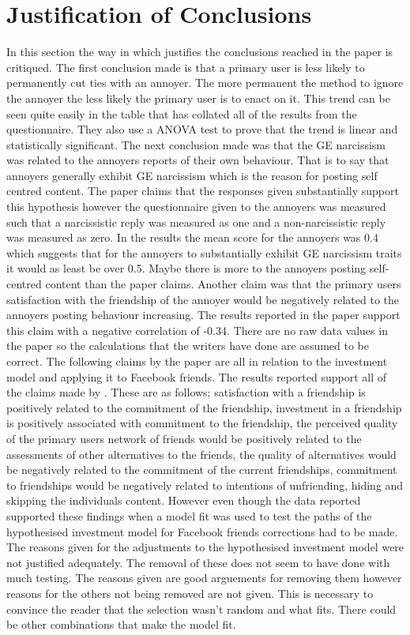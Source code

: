 \documentclass[12pt]{article}
\begin{document}
\section{Justification of Conclusions}
In this section the way in which \cite{Carpenter} justifies the conclusions reached in the paper is critiqued. The first conclusion made is that a primary user is less likely to permanently cut ties with an annoyer. The more permanent the method to ignore the annoyer the less likely the primary user is to enact on it. This trend can be seen quite easily in the table that has collated all of the results from the questionnaire. They also use a ANOVA test to prove that the trend is linear and statistically significant. 
The next conclusion made was that the GE narcissism was related to the annoyers reports of their own behaviour. That is to say that annoyers generally exhibit GE narcissism which is the reason for posting self centred content. The paper claims that the responses given substantially support this hypothesis however the questionnaire given to the annoyers was measured such that a narcissistic reply was measured as one and a non-narcissistic reply was measured as zero. In the results the mean score for the annoyers was 0.4 which suggests that for the annoyers to substantially exhibit GE narcissism traits it would as least be over 0.5. Maybe there is more to the annoyers posting self-centred content than the paper claims. 
Another claim was that the primary users satisfaction with the friendship of the annoyer would be negatively related to the annoyers posting behaviour increasing. The results reported in the paper support this claim with a negative correlation of -0.34. There are no raw data values in the paper so the calculations that the writers have done are assumed to be correct.
The following claims by the paper are all in relation to the investment model and applying it to Facebook friends. The results reported support all of the claims made by \cite{Carpenter}. These are as follows; satisfaction with a friendship is positively related to the commitment of the friendship, investment in a friendship is positively associated with commitment to the friendship, the perceived quality of the primary users network of friends would be positively related to the assessments of other alternatives to the friends, the quality of alternatives would be negatively related to the commitment of the current friendships, commitment to friendships would be negatively related to intentions of unfriending, hiding and skipping the individuals content. 
However even though the data reported supported these findings when a model fit was used to test the paths of the hypothesised investment model for Facebook friends corrections had to be made. The reasons given for the adjustments to the hypothesised investment model were not justified adequately. The removal of these does not seem to have done with much testing. The reasons given are good arguements for removing them however reasons for the others not being removed are not given. This is necessary to convince the reader that the selection wasn't random and what fits. There could be other combinations that make the model fit.
\end{document}
